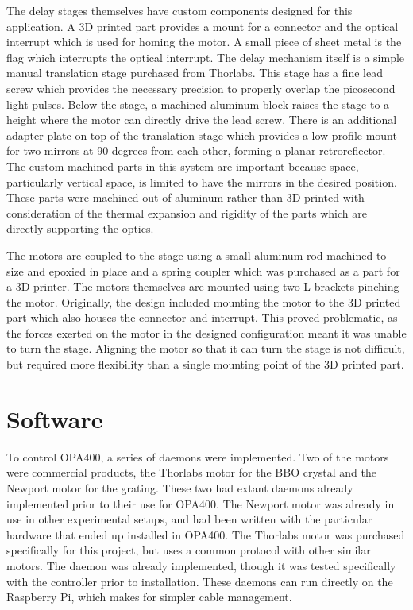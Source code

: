 The delay stages themselves have custom components designed for this application.
A 3D printed part provides a mount for a connector and the optical interrupt which is used for homing the motor.
A small piece of sheet metal is the flag which interrupts the optical interrupt.
The delay mechanism itself is a simple manual translation stage purchased from Thorlabs\cite{}.
This stage has a fine lead screw which provides the necessary precision to properly overlap the picosecond light pulses.
Below the stage, a machined aluminum block raises the stage to a height where the motor can directly drive the lead screw.
There is an additional adapter plate on top of the translation stage which provides a low profile mount for two mirrors at 90 degrees from each other, forming a planar retroreflector.
The custom machined parts in this system are important because space, particularly vertical space, is limited to have the mirrors in the desired position.
These parts were machined out of aluminum rather than 3D printed with consideration of the thermal expansion and rigidity of the parts which are directly supporting the optics.

The motors are coupled to the stage using a small aluminum rod machined to size and epoxied in place and a spring coupler which was purchased as a part for a 3D printer\cite{}.
The motors themselves are mounted using two L-brackets pinching the motor.
Originally, the design included mounting the motor to the 3D printed part which also houses the connector and interrupt.
This proved problematic, as the forces exerted on the motor in the designed configuration meant it was unable to turn the stage.
Aligning the motor so that it can turn the stage is not difficult, but required more flexibility than a single mounting point of the 3D printed part.


\clearpage

\section{Software}  %

To control OPA400, a series of \yaq{} daemons were implemented.
Two of the motors were commercial products, the Thorlabs motor for the BBO crystal and the Newport motor for the grating.
These two had extant daemons already implemented prior to their use for OPA400\cite{}\cite{}.
The Newport motor was already in use in other experimental setups, and had been written with the particular hardware that ended up installed in OPA400.
The Thorlabs motor was purchased specifically for this project, but uses a common protocol with other similar motors.
The daemon was already implemented, though it was tested specifically with the controller prior to installation.
These daemons can run directly on the Raspberry Pi, which makes for simpler cable management.

